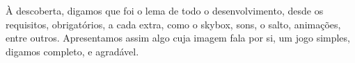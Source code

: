 À descoberta, digamos que foi o lema de todo o desenvolvimento, desde os requisitos, obrigatórios, a cada extra, como o skybox, sons, o salto, animações, entre outros. Apresentamos assim algo cuja imagem fala por si, um jogo simples, digamos completo, e agradável.
